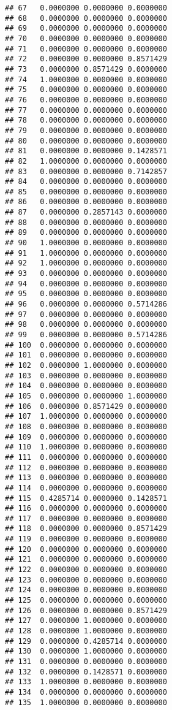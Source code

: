 \documentclass[
]{article}
\begin{document}
\begin{verbatim}
## 67   0.0000000 0.0000000 0.0000000
## 68   0.0000000 0.0000000 0.0000000
## 69   0.0000000 0.0000000 0.0000000
## 70   0.0000000 0.0000000 0.0000000
## 71   0.0000000 0.0000000 0.0000000
## 72   0.0000000 0.0000000 0.8571429
## 73   0.0000000 0.8571429 0.0000000
## 74   1.0000000 0.0000000 0.0000000
## 75   0.0000000 0.0000000 0.0000000
## 76   0.0000000 0.0000000 0.0000000
## 77   0.0000000 0.0000000 0.0000000
## 78   0.0000000 0.0000000 0.0000000
## 79   0.0000000 0.0000000 0.0000000
## 80   0.0000000 0.0000000 0.0000000
## 81   0.0000000 0.0000000 0.1428571
## 82   1.0000000 0.0000000 0.0000000
## 83   0.0000000 0.0000000 0.7142857
## 84   0.0000000 0.0000000 0.0000000
## 85   0.0000000 0.0000000 0.0000000
## 86   0.0000000 0.0000000 0.0000000
## 87   0.0000000 0.2857143 0.0000000
## 88   0.0000000 0.0000000 0.0000000
## 89   0.0000000 0.0000000 0.0000000
## 90   1.0000000 0.0000000 0.0000000
## 91   1.0000000 0.0000000 0.0000000
## 92   1.0000000 0.0000000 0.0000000
## 93   0.0000000 0.0000000 0.0000000
## 94   0.0000000 0.0000000 0.0000000
## 95   0.0000000 0.0000000 0.0000000
## 96   0.0000000 0.0000000 0.5714286
## 97   0.0000000 0.0000000 0.0000000
## 98   0.0000000 0.0000000 0.0000000
## 99   0.0000000 0.0000000 0.5714286
## 100  0.0000000 0.0000000 0.0000000
## 101  0.0000000 0.0000000 0.0000000
## 102  0.0000000 1.0000000 0.0000000
## 103  0.0000000 0.0000000 0.0000000
## 104  0.0000000 0.0000000 0.0000000
## 105  0.0000000 0.0000000 1.0000000
## 106  0.0000000 0.8571429 0.0000000
## 107  1.0000000 0.0000000 0.0000000
## 108  0.0000000 0.0000000 0.0000000
## 109  0.0000000 0.0000000 0.0000000
## 110  1.0000000 0.0000000 0.0000000
## 111  0.0000000 0.0000000 0.0000000
## 112  0.0000000 0.0000000 0.0000000
## 113  0.0000000 0.0000000 0.0000000
## 114  0.0000000 0.0000000 0.0000000
## 115  0.4285714 0.0000000 0.1428571
## 116  0.0000000 0.0000000 0.0000000
## 117  0.0000000 0.0000000 0.0000000
## 118  0.0000000 0.0000000 0.8571429
## 119  0.0000000 0.0000000 0.0000000
## 120  0.0000000 0.0000000 0.0000000
## 121  0.0000000 0.0000000 0.0000000
## 122  0.0000000 0.0000000 0.0000000
## 123  0.0000000 0.0000000 0.0000000
## 124  0.0000000 0.0000000 0.0000000
## 125  0.0000000 0.0000000 0.0000000
## 126  0.0000000 0.0000000 0.8571429
## 127  0.0000000 1.0000000 0.0000000
## 128  0.0000000 1.0000000 0.0000000
## 129  0.0000000 0.4285714 0.0000000
## 130  0.0000000 1.0000000 0.0000000
## 131  0.0000000 0.0000000 0.0000000
## 132  0.0000000 0.1428571 0.0000000
## 133  1.0000000 0.0000000 0.0000000
## 134  0.0000000 0.0000000 0.0000000
## 135  1.0000000 0.0000000 0.0000000

\end{verbatim}
\end{document}
